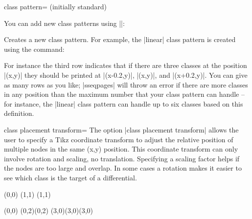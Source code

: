 \documentclass{ltxdoc}
\begin{document}
\begin{sseqdata}[name=ex1,degree={#1}{1-#1}]
\begin{key}{class pattern= (initially standard)}
\begin{codeexample}[]
\printpage[name=class pattern example, class pattern=standard]
\printpage[name=class pattern example, change classes=blue,
           class pattern=linear, class placement transform={rotate=45}]
\end{codeexample}

You can add new class patterns using |\sseqnewclasspattern|:
\begin{command}{\sseqnewclasspattern{}}
Creates a new class pattern. For example, the |linear| class pattern is created using the command:
\begin{codeexample}
\end{codeexample}
For instance the third row indicates that if there are three classes at the position |(x,y)| they should be printed at |(x-0.2,y)|, |(x,y)|, and |(x+0.2,y)|. You can give as many rows as you like; |sseqpages| will throw an error if there are more classes in any position than the maximum number that your class pattern can handle -- for instance, the |linear| class pattern can handle up to six classes based on this definition.
\end{command}
\end{key}


\begin{key}{class placement transform=}
The option |class placement transform| allows the user to specify a Tikz coordinate transform to adjust the relative position of multiple nodes in the same (x,y) position. This coordinate transform can only involve rotation and scaling, no translation. Specifying a scaling factor helps if the nodes are too large and overlap. In some cases a rotation makes it easier to see which class is the target of a differential.
\begin{codeexample}[width=5cm]
\begin{sseqpage}[classes={draw=none},class placement transform={xscale=3},
                 math nodes, xscale=2, x axis extend end=0.7cm]
\class["\mathbb{Z}"](0,0)
\class["\mathbb{Z}/2"](1,1)
\class["\mathbb{Z}/3"](1,1)
\end{sseqpage}
\end{codeexample}
\begin{codeexample}[width=5cm]
\begin{sseqpage}[classes=fill,class placement transform={rotate=40},
                 cohomological Serre grading,differentials=blue,scale=0.7]
\class(0,0)
\class(0,2)\class(0,2)
\class[red](3,0)\class[green](3,0)\class[blue](3,0)


\end{sseqpage}
\end{codeexample}
\end{key}
\end{sseqdata}
\end{document}
